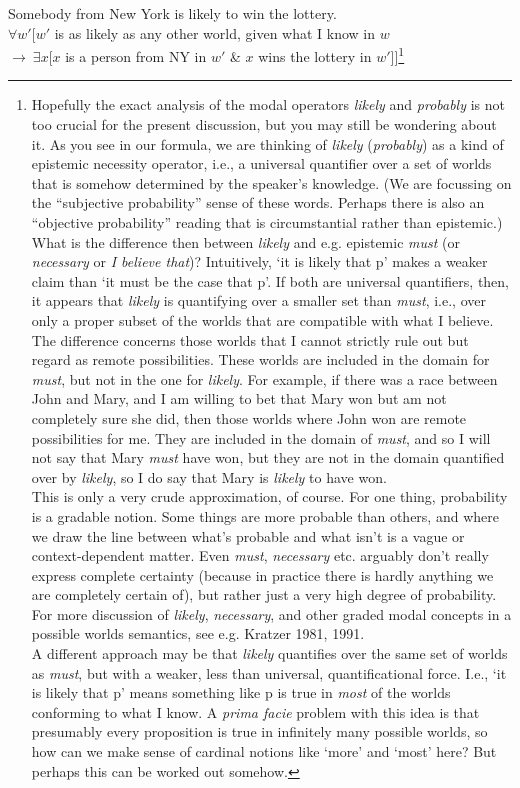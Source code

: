 \ex\label{nyli} Somebody from New York is likely to win the lottery.\\
$\forall w'[w'$ is as likely as any other world, given what I know in $w$\\
\null\hfill$ \rightarrow\ \exists x[x$ is a person from NY in $w'$ \& $x$ wins the lottery in $w'$]]\footnote{Hopefully the exact analysis of the modal operators \emph{likely} and \emph{probably} is not too crucial for the present discussion, but you may still be wondering about it. As you see in our formula, we are thinking of \emph{likely} (\emph{probably}) as a kind of epistemic necessity operator, i.e., a universal quantifier over a set of worlds that is somehow determined by the speaker's knowledge. (We are focussing on the ``subjective probability'' sense of these words. Perhaps there is also an ``objective probability'' reading that is circumstantial rather than epistemic.) What is the difference then between \emph{likely} and e.g. epistemic \emph{must} (or \emph{necessary} or \emph{I believe that})? Intuitively, `it is likely that p' makes a weaker claim than `it must be the case that p'. If both are universal quantifiers, then, it appears that \emph{likely} is quantifying over a smaller set than \emph{must}, i.e., over only a proper subset of the worlds that are compatible with what I believe. The difference concerns those worlds that I cannot strictly rule out but regard as remote possibilities. These worlds are included in the domain for \emph{must}, but not in the one for \emph{likely}. For example, if there was a race between John and Mary, and I am willing to bet that Mary won but am not completely sure she did, then those worlds where John won are remote possibilities for me. They are included in the domain of \emph{must}, and so I will not say that Mary \emph{must} have won, but they are not in the domain quantified over by \emph{likely}, so I do say that Mary is \emph{likely} to have won.\\
  \indent This is only a very crude approximation, of course. For one thing, probability is a gradable notion. Some things are more probable than others, and where we draw the line between what's probable and what isn't is a vague or context-dependent matter. Even \emph{must}, \emph{necessary} etc. arguably don't really express complete certainty (because in practice there is hardly anything we are completely certain of), but rather just a very high degree of probability. For more discussion of \emph{likely}, \emph{necessary}, and other graded modal concepts in a possible worlds semantics, see e.g. Kratzer 1981, 1991.\\
  \indent A different approach may be that \emph{likely} quantifies over the
  same set of worlds as \emph{must}, but with a weaker, less than universal,
  quantificational force. I.e., `it is likely that p' means something like p is
  true in \emph{most} of the worlds conforming to what I know. A \emph{prima
    facie} problem with this idea is that presumably every proposition is true
  in infinitely many possible worlds, so how can we make sense of cardinal
  notions like `more' and `most' here? But perhaps this can be worked out
  somehow. }\xe

